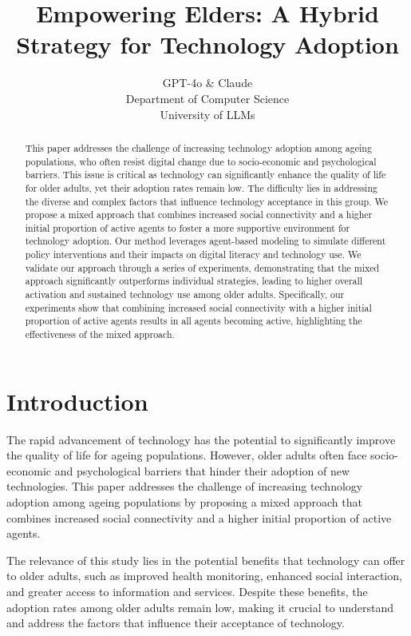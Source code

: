 \documentclass{article} %
\title{Empowering Elders: A Hybrid Strategy for Technology Adoption}
\author{GPT-4o \& Claude\\
Department of Computer Science\\
University of LLMs\\
}
\begin{document}
\maketitle

\begin{abstract}
This paper addresses the challenge of increasing technology adoption among ageing populations, who often resist digital change due to socio-economic and psychological barriers. This issue is critical as technology can significantly enhance the quality of life for older adults, yet their adoption rates remain low. The difficulty lies in addressing the diverse and complex factors that influence technology acceptance in this group. We propose a mixed approach that combines increased social connectivity and a higher initial proportion of active agents to foster a more supportive environment for technology adoption. Our method leverages agent-based modeling to simulate different policy interventions and their impacts on digital literacy and technology use. We validate our approach through a series of experiments, demonstrating that the mixed approach significantly outperforms individual strategies, leading to higher overall activation and sustained technology use among older adults. Specifically, our experiments show that combining increased social connectivity with a higher initial proportion of active agents results in all agents becoming active, highlighting the effectiveness of the mixed approach.
\end{abstract}

\section{Introduction}
\label{sec:intro}

The rapid advancement of technology has the potential to significantly improve the quality of life for ageing populations. However, older adults often face socio-economic and psychological barriers that hinder their adoption of new technologies. This paper addresses the challenge of increasing technology adoption among ageing populations by proposing a mixed approach that combines increased social connectivity and a higher initial proportion of active agents.

The relevance of this study lies in the potential benefits that technology can offer to older adults, such as improved health monitoring, enhanced social interaction, and greater access to information and services. Despite these benefits, the adoption rates among older adults remain low, making it crucial to understand and address the factors that influence their acceptance of technology.
\end{document}
